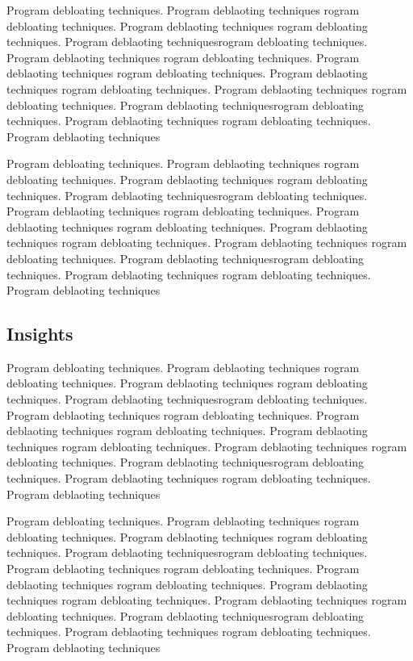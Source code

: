 \documentclass{relatorio}
\begin{document}
Program debloating techniques. Program deblaoting techniques rogram debloating techniques. Program deblaoting techniques
rogram debloating techniques. Program deblaoting techniquesrogram debloating techniques. Program deblaoting techniques
rogram debloating techniques. Program deblaoting techniques rogram debloating techniques. Program deblaoting techniques
rogram debloating techniques. Program deblaoting techniques 
rogram debloating techniques. Program deblaoting techniquesrogram debloating techniques. Program deblaoting techniques
rogram debloating techniques. Program deblaoting techniques

Program debloating techniques. Program deblaoting techniques rogram debloating techniques. Program deblaoting techniques
rogram debloating techniques. Program deblaoting techniquesrogram debloating techniques. Program deblaoting techniques
rogram debloating techniques. Program deblaoting techniques rogram debloating techniques. Program deblaoting techniques
rogram debloating techniques. Program deblaoting techniques 
rogram debloating techniques. Program deblaoting techniquesrogram debloating techniques. Program deblaoting techniques
rogram debloating techniques. Program deblaoting techniques

\subsection{Insights}%
\label{Tools}

Program debloating techniques. Program deblaoting techniques rogram debloating techniques. Program deblaoting techniques
rogram debloating techniques. Program deblaoting techniquesrogram debloating techniques. Program deblaoting techniques
rogram debloating techniques. Program deblaoting techniques rogram debloating techniques. Program deblaoting techniques
rogram debloating techniques. Program deblaoting techniques 
rogram debloating techniques. Program deblaoting techniquesrogram debloating techniques. Program deblaoting techniques
rogram debloating techniques. Program deblaoting techniques

Program debloating techniques. Program deblaoting techniques rogram debloating techniques. Program deblaoting techniques
rogram debloating techniques. Program deblaoting techniquesrogram debloating techniques. Program deblaoting techniques
rogram debloating techniques. Program deblaoting techniques rogram debloating techniques. Program deblaoting techniques
rogram debloating techniques. Program deblaoting techniques 
rogram debloating techniques. Program deblaoting techniquesrogram debloating techniques. Program deblaoting techniques
rogram debloating techniques. Program deblaoting techniques
\end{document}
